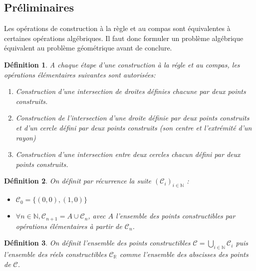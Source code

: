 \documentclass[a4paper,12pt,french,draft]{report}
\newtheorem{definition}{Définition}[section]
\begin{document}
			\subsection{Préliminaires}
			Les opérations de construction à la règle et au compas sont équivalentes à certaines opérations algébriques. Il faut donc formuler un problème algébrique équivalent au problème géométrique avant de conclure.
			
			\begin{definition}
				A chaque étape d'une construction à la régle et au compas, les opérations élémentaires suivantes sont autorisées:
				\begin{enumerate}
					\item Construction d'une intersection de droites définies chacune par deux points construits.
					\item Construction de l'intersection d'une droite définie par deux points construits et d'un cercle défini par deux points construits (son centre et l'extrémité d'un rayon)
					\item Construction d'une intersection entre deux cercles chacun défini par deux points construits.
				\end{enumerate}
			\end{definition}
			
			\begin{definition}
				On définit par récurrence la suite \((\mathscr{C}_i)_{i \in \mathbb{N}} \) :
				
				
				
				\begin{itemize}
					\item \(\mathscr{C}_0 = \{(0, 0), (1, 0)\}\)
					\item \(\forall n \in \mathbb{N}, \mathscr{C}_{n+1} = A\cup \mathscr{C}_{n}\), avec \(A\) l'ensemble des points constructibles par opérations élémentaires à partir de \( \mathscr{C}_{n} \).
				\end{itemize}
			\end{definition}
			
			\begin{definition}
				On définit l'ensemble des points constructibles \(\mathscr{C} = \bigcup_{i \in \mathbb{N}} \mathscr{C}_i \) puis l'ensemble des réels constructibles \(\mathscr{C}_\mathbb{R}\) comme l'ensemble des abscisses des points de \( \mathscr{C} \).
			\end{definition}
				
\end{document}
